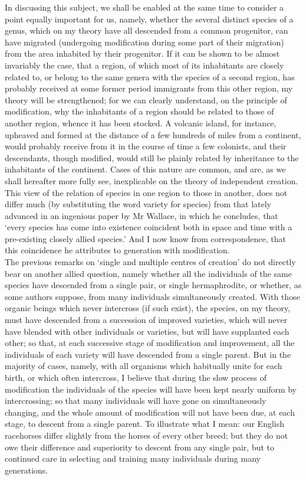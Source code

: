 \indent In discussing this subject, we shall be enabled at the same time to consider a point equally important for us, namely, whether the several distinct species of a genus, which on my theory have all descended from a common progenitor, can have migrated (undergoing modification during some part of their migration) from the area inhabited by their progenitor. If it can be shown to be almost invariably the case, that a region, of which most of its inhabitants are closely related to, or belong to the same genera with the species of a second region, has probably received at some former period immigrants from this other region, my theory will be strengthened; for we can clearly understand, on the principle of modification, why the inhabitants of a region should be related to those of another region, whence it has been stocked. A volcanic island, for instance, upheaved and formed at the distance of a few hundreds of miles from a continent, would probably receive from it in the course of time a few colonists, and their descendants, though modified, would still be plainly related by inheritance to the inhabitants of the continent.  Cases of this nature are common, and are, as we shall hereafter more fully see, inexplicable on the theory of independent creation. This view of the relation of species in one region to those in another, does not differ much (by substituting the word variety for species) from that lately advanced in an ingenious paper by Mr Wallace, in which he concludes, that `every species has come into existence coincident both in space and time with a pre-existing closely allied species.' And I now know from correspondence, that this coincidence he attributes to generation with modification.~\\
\indent The previous remarks on `single and multiple centres of creation' do not directly bear on another allied question, namely whether all the individuals of the same species have descended from a single pair, or single hermaphrodite, or whether, as some authors suppose, from many individuals simultaneously created. With those organic beings which never intercross (if such exist), the species, on my theory, must have descended from a succession of improved varieties, which will never have blended with other individuals or varieties, but will have supplanted each other; so that, at each successive stage of modification and improvement, all the individuals of each variety will have descended from a single parent. But in the majority of cases, namely, with all organisms which habitually unite for each birth, or which often intercross, I believe that during the slow process of modification the individuals of the species will have been kept nearly uniform by intercrossing; so that many individuals will have gone on simultaneously changing, and the whole amount of modification will not have been due, at each stage, to descent from a single parent. To illustrate what I mean: our English racehorses differ slightly from the horses of every other breed; but they do not owe their difference and superiority to descent from any single pair, but to continued care in selecting and training many individuals during many generations.~\\
